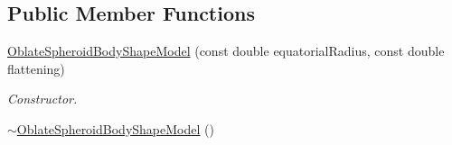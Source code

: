 \subsection*{Public Member Functions}
\begin{DoxyCompactItemize}
\item 
\hyperlink{classtudat_1_1basic__astrodynamics_1_1OblateSpheroidBodyShapeModel_aebf1990811f769576c13381ce78a015b}{Oblate\+Spheroid\+Body\+Shape\+Model} (const double equatorial\+Radius, const double flattening)
\begin{DoxyCompactList}\small\item\em Constructor. \end{DoxyCompactList}\item 
\hyperlink{classtudat_1_1basic__astrodynamics_1_1OblateSpheroidBodyShapeModel_a950481963aae3938aaf993c80f5aba79}{$\sim$\+Oblate\+Spheroid\+Body\+Shape\+Model} ()\hypertarget{classtudat_1_1basic__astrodynamics_1_1OblateSpheroidBodyShapeModel_a950481963aae3938aaf993c80f5aba79}{}\label{classtudat_1_1basic__astrodynamics_1_1OblateSpheroidBodyShapeModel_a950481963aae3938aaf993c80f5aba79}


\end{DoxyCompactItemize}
